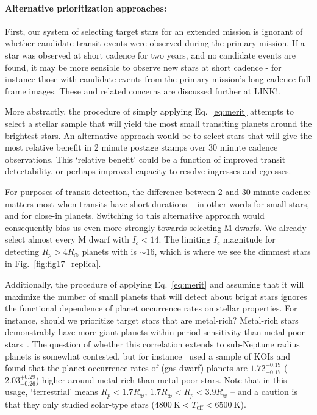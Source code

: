 \paragraph{Alternative prioritization approaches:}
First, our system of selecting target stars for an extended mission is ignorant of whether candidate transit events were observed during the primary mission.
If a star was observed at short cadence for two years, and no candidate events are found, it may be more sensible to observe new stars at short cadence - for instance those with candidate events from the primary mission's long cadence full frame images. 
These and related concerns are discussed further at LINK!.

More abstractly, the procedure of simply applying Eq.~\ref{eq:merit} attempts to select a stellar sample that will yield the most small transiting planets around the brightest stars.
An alternative approach would be to select stars that will give the most relative benefit in 2 minute postage stamps over 30 minute cadence observations.
This `relative benefit' could be a function of improved transit detectability, or perhaps improved capacity to resolve ingresses and egresses.

For purposes of transit detection, the difference between 2 and 30 minute cadence matters most when transits have short durations -- in other words for small stars, and for close-in planets.
Switching to this alternative approach would consequently bias us even more strongly towards selecting M dwarfs.
We already select almost every M dwarf with $I_c < 14$.
The limiting $I_c$ magnitude for detecting $R_p > 4R_\oplus$ planets with \tess is $\sim 16$, which is where we see the dimmest stars in Fig.~\ref{fig:fig17_replica}.

Additionally, the procedure of applying Eq.~\ref{eq:merit} and assuming that it will maximize the number of small planets that \tess will detect about bright stars ignores the functional dependence of planet occurrence rates on stellar properties.
For instance, should we prioritize target stars that are metal-rich?
Metal-rich stars demonstrably have more giant planets within \tesss period sensitivity than metal-poor stars~\citep{fischer_planet-metallicity_2005,johnson_giant_2010}.
The question of whether this correlation extends to sub-Neptune radius planets is somewhat contested, but for instance~\citet{wang_revealing_2015} used a sample of KOIs and found that the planet occurrence rates of (gas dwarf) planets are $1.72^{+0.19}_{-0.17}$ ($2.03^{+0.29}_{-0.26}$) higher around metal-rich than metal-poor stars.
Note that in this usage, `terrestrial' means $R_p<1.7R_\oplus$, $1.7R_\oplus < R_p < 3.9R_\oplus$ -- and a caution is that they only studied solar-type stars ($4800\ \mathrm{K}<T_\mathrm{eff}<6500\ \mathrm{K}$).

